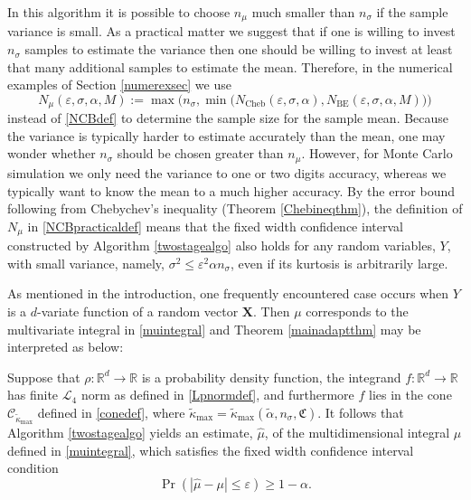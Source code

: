 \documentclass[graybox]{svmult}
\newcommand{\fudge}{\mathfrak{C}}
\newcommand\reals{\mathbb{R}}
\newcommand{\vX}{\boldsymbol{X}}
\newcommand{\tkappa}{\tilde{\kappa}}
\newcommand{\cc}{\mathcal{C}}
\newcommand{\cl}{\mathcal{L}}
\begin{document}
\begin{remark} In this algorithm it is possible to choose $n_{\mu}$ much smaller than  $n_\sigma$ if the sample variance is small.  As a practical matter we suggest that if one is willing to invest $n_\sigma$ samples to estimate the variance then one should be willing to invest at least that many additional samples to estimate the mean.  Therefore, in the numerical examples of Section \ref{numerexsec} we use
\begin{equation} \label{NCBpracticaldef}
N_{\mu}(\varepsilon,\sigma,\alpha,M) 
:= \max\bigl( n_{\sigma}, \min\bigl(N_{\text{Cheb}}(\varepsilon,\sigma,\alpha), 
N_{\text{BE}}(\varepsilon,\sigma,\alpha,M) \bigr) \bigr)
\end{equation} 
instead of \eqref{NCBdef} to determine the sample size for the sample mean.  Because the variance is typically harder to estimate accurately than the mean, one may wonder whether $n_\sigma$ should be chosen greater than $n_\mu$.  However, for Monte Carlo simulation we only need the variance to one or two digits accuracy, whereas we typically want to know the mean to a much higher accuracy.  By the error bound following from Chebychev's inequality (Theorem \ref{Chebineqthm}), the definition of $N_{\mu}$ in \eqref{NCBpracticaldef} means that the fixed width confidence interval constructed by Algorithm \ref{twostagealgo} also holds for any random variables, $Y$, with small variance, namely, $\sigma^2 \le \varepsilon^2 \alpha n_{\sigma}$, even if its kurtosis is arbitrarily large.
\end{remark}

\bigskip

As mentioned in the introduction, one frequently encountered case occurs when  $Y$ is a $d$-variate function of a random vector $\vX$. Then $\mu$ corresponds to the multivariate integral in \eqref{muintegral} and Theorem \ref{mainadaptthm} may be interpreted as below:

\begin{corollary} \label{integcor} Suppose that $\rho:\reals^d \to \reals$ is a probability density function, the integrand $f: \reals^d \to \reals$ has finite $\cl_4$ norm as defined in \eqref{Lpnormdef}, and furthermore $f$ lies in the cone $\cc_{\tkappa_{\max}}$ defined in \eqref{conedef}, where $\tkappa_{\max}=\tilde\kappa_{\max}(\tilde\alpha,n_\sigma,\fudge)$.  It follows that Algorithm  \ref{twostagealgo}  yields an estimate,
$\hat\mu$, of the multidimensional integral $\mu$ defined in \eqref{muintegral}, which satisfies the fixed width confidence interval condition
$$\Pr( |\hat\mu-\mu|\le\varepsilon)\ge 1-\alpha.$$
\end{corollary}
\end{document}
